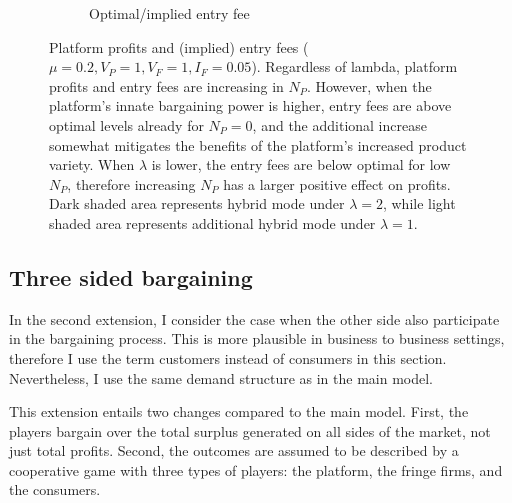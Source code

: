 \documentclass[a4paper]{article}
\begin{document}
\begin{figure}
\begin{subfigure}[b]{0.45\textwidth}
        \caption{Optimal/implied entry fee}
        \label{fig:entry_fee_high_lambda}
    \end{subfigure}
    \caption{Platform profits and (implied) entry fees ($\mu = 0.2, V_P = 1, V_F = 1, I_F = 0.05$). Regardless of lambda, platform profits and entry fees are increasing in $N_P$. However, when the platform's innate bargaining power is higher, entry fees are above optimal levels already for $N_P = 0$, and the additional increase somewhat mitigates the benefits of the platform's increased product variety. When $\lambda$ is lower, the entry fees are below optimal for low $N_P$, therefore increasing $N_P$ has a larger positive effect on profits. Dark shaded area represents hybrid mode under $\lambda=2$, while light shaded area represents additional hybrid mode under $\lambda=1$.}
    \label{fig:profits_and_entry_fees_high_lambda}
\end{figure}


\subsection{Three sided bargaining }
\label{sec:two_sided}

In the second extension, I consider the case when the other side also participate in the bargaining process.
This is more plausible in business to business settings, therefore I use the term customers instead of consumers in this section.
Nevertheless, I use the same demand structure as in the main model.

This extension entails two changes compared to the main model.
First, the players bargain over the total surplus generated on all sides of the market, not just total profits.
Second, the outcomes are assumed to be described by a cooperative game with three types of players: the platform, the fringe firms, and the consumers.
\end{document}
